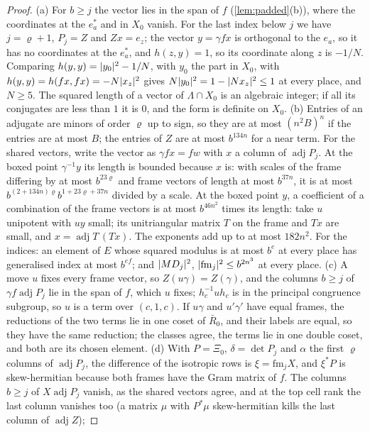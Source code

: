 \begin{proof}
(a) For $b\ge j$ the vector lies in the span of $f$ (\cref{lem:padded}(b)), where the coordinates at the $e^*_a$ and in $X_0$ vanish. For the last index below $j$ we have $j=\varrho+1$, $P_j=Z$ and $Zx=e_z$; the vector
$y=\gamma fx$ is orthogonal to the $e_a$, so it has no coordinates at the $e^*_a$, and $h(z,y)=1$, so its coordinate along $z$ is $-1/N$. Comparing $h(y,y)=\lvert y_0\rvert^2-1/N$, with $y_0$ the part in $X_0$, with
$h(y,y)=h(fx,fx)=-N\lvert x_z\rvert^2$ gives $N\lvert y_0\rvert^2=1-\lvert Nx_z\rvert^2\le1$ at every place, and $N\ge5$. The squared length of a vector of $\Lambda\cap X_0$ is an algebraic integer; if all its conjugates are less than $1$ it is $0$, and the form is definite on $X_0$.
(b) Entries of an adjugate are minors of order $\varrho$ up to sign, so they are at most $(n^2B)^n$ if the entries are at most $B$; the entries of $Z$ are at most $b^{134n}$ for a near term. For the shared vectors, write the
vector as $\gamma fx=fw$ with $x$ a column of $\operatorname{adj}P_j$. At the boxed point $\gamma^{-1}y$ its length is bounded because $x$ is: with scales of the frame differing by at most $b^{23\varrho}$ and frame vectors of
length at most $b^{37n}$, it is at most $b^{(2+134n)\varrho}b^{1+23\varrho+37n}$ divided by a scale. At the boxed point $y$, a coefficient of a combination of the frame vectors is at most $b^{46n^2}$ times its length:
take $u$ unipotent with $uy$ small; its unitriangular matrix $T$ on the frame and $Tx$ are small, and $x=\operatorname{adj}T\,(Tx)$. The exponents add up to at most $182n^2$. For the indices: an element of $E$ whose squared
modulus is at most $b^e$ at every place has generalised index at most $b^{ef}$; and $\lvert MD_j\rvert^2$, $\lvert \mathrm{fm}_j\rvert^2\le b^{2n^3}$ at every place.
(c) A move $u$ fixes every frame vector, so $Z(u\gamma)=Z(\gamma)$, and the columns $b\ge j$ of $\gamma f\operatorname{adj}P_j$ lie in the span of $f$, which $u$ fixes; $h_c^{-1}uh_c$ is in the principal congruence subgroup, so $u$ is a
term over $(c,1,c)$. If $u\gamma$ and $u'\gamma'$ have equal frames, the reductions of the two terms lie in one coset of $\bar R_0$, and their labels are equal, so they have the same reduction; the classes agree, the terms lie in
one double coset, and both are its chosen element.
(d) With $P=\Xi_0$, $\delta=\det P_j$ and $\alpha$ the first $\varrho$ columns of $\operatorname{adj}P_j$, the difference of the isotropic rows is $\xi=\mathrm{fm}_jX$, and $\xi^*P$ is skew-hermitian because both frames have the Gram matrix of
$f$. The columns $b\ge j$ of $X\operatorname{adj}P_j$ vanish, as the shared vectors agree, and at the top cell rank the last column vanishes too (a matrix $\mu$ with $P^*\mu$ skew-hermitian kills the last column of $\operatorname{adj}Z$);

\end{proof}

